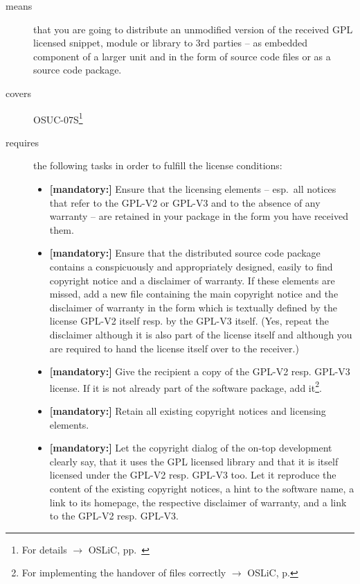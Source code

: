 \begin{description}

\item[means] that you are going to distribute an unmodified version of the
received GPL licensed snippet, module or library to 3rd parties -- as embedded
component of a larger unit and in the form of source code files or as a source
code package.

\item[covers] OSUC-07S\footnote{For details $\rightarrow$
OSLiC, pp.\ \pageref{OSUC-07S-DEF}}

\item[requires] the following tasks in order to fulfill the license conditions:
\begin{itemize}
 
  \item \textbf{[mandatory:]} Ensure that the licensing elements -- esp.\ all
  notices that refer to the GPL-V2 or GPL-V3 and to the absence of any
  warranty -- are retained in your package in the form you have received them.

  \item \textbf{[mandatory:]} Ensure that the distributed source code package
  contains a conspicuously and appropriately designed, easily to find copyright
  notice and a disclaimer of warranty. If these elements are missed, add a new
  file containing the main copyright notice and the disclaimer of warranty in the
  form which is textually defined by the license GPL-V2 itself resp. by the
  GPL-V3 itself. (Yes, repeat the disclaimer although it is also part of the
  license itself and although you are required to hand the license itself over
  to the receiver.)
  
  \item \textbf{[mandatory:]} Give the recipient a copy of the GPL-V2 resp.
  GPL-V3 license. If it is not already part of the software package, add
  it\footnote{For implementing the handover of files correctly $\rightarrow$
  OSLiC, p. \pageref{DistributingFilesHint}}.

  \item \textbf{[mandatory:]} Retain all existing copyright notices and
  licensing elements.
    
  \item \textbf{[mandatory:]} Let the copyright dialog of the on-top development
  clearly say, that it uses the GPL licensed library and that it is itself
  licensed under the GPL-V2 resp. GPL-V3 too. Let it reproduce the content of
  the existing copyright notices, a hint to the software name, a link to its
  homepage, the respective disclaimer of warranty, and a link to the GPL-V2
  resp. GPL-V3.    
    

\end{itemize}
\end{description}
